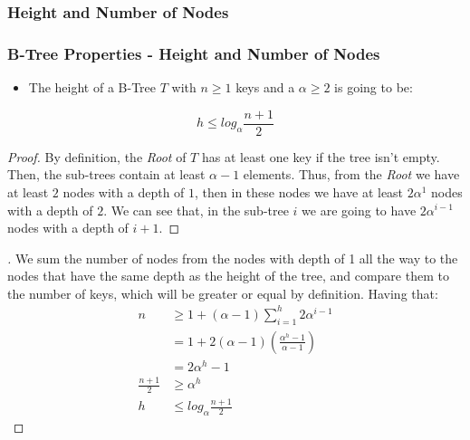 \documentclass{beamer}
\begin{document}
\begin{frame}
    \subsubsection{Height and Number of Nodes}
    \frametitle{B-Tree Properties - Height and Number of Nodes}
    \begin{itemize}
        \item The height of a B-Tree \(T\) with \(n \geq 1\) keys and a \(\alpha \geq 2\) is going to be:
    \end{itemize}
    \[
        h \leq log_{\alpha} \frac{n + 1}{2}
    \]
    \begin{proof}\renewcommand{\qedsymbol}{}
        By definition, the \emph{Root} of \(T\) has at least one key if the tree isn't empty. Then, the sub-trees contain at least \(\alpha - 1\) elements. Thus, from the \emph{Root} we have at least \(2\) nodes with a depth of \(1\), then in these nodes we have at least \(2\alpha^{1}\) nodes with a depth of \(2\). We can see that, in the sub-tree \(i\) we are going to have \(2\alpha^{i-1}\) nodes with a depth of \(i + 1\). 
    \end{proof}
    \begin{proof}[\unskip\nopunct]
        We sum the number of nodes from the nodes with depth of 1 all the way to the nodes that have the same depth as the height of the tree, and compare them to the number of keys, which will be greater or equal by definition. Having that:
        \[
            \begin{aligned}
                n &\geq 1 + \left(\alpha - 1\right) \sum_{i = 1}^{h} 2\alpha^{i - 1} \\
                &= 1 + 2\left(\alpha - 1\right)\left(\frac{\alpha^{h} - 1}{\alpha - 1}\right) \\
                &= 2\alpha^h - 1 \\
                \frac{n + 1}{2} &\geq \alpha^h \\
                h &\leq log_{\alpha} \frac{n + 1}{2}
            \end{aligned}
        \]
    \end{proof}
\end{frame}
\end{document}
